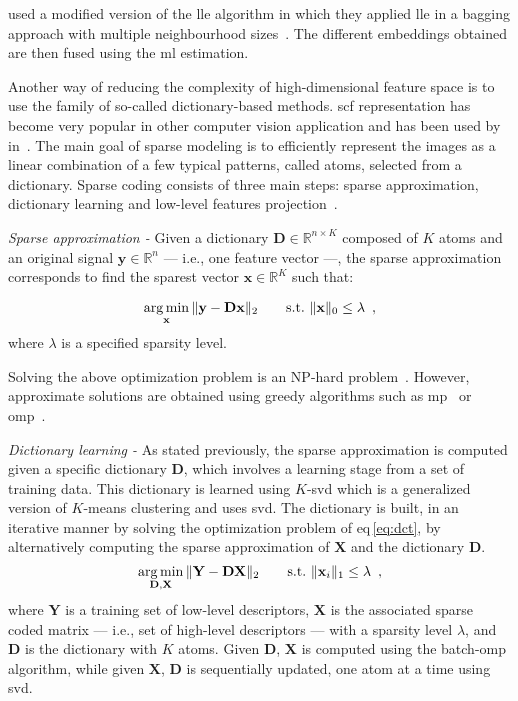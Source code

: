 \citeauthor{Tiwari2008} used a modified version of the \ac{lle} algorithm in which they applied \ac{lle} in a bagging approach with multiple neighbourhood sizes~\cite{Tiwari2008}.
The different embeddings obtained are then fused using the \ac{ml} estimation.

Another way of reducing the complexity of high-dimensional feature space is to use the family of so-called dictionary-based methods.
\Ac{scf} representation has become very popular in other computer vision application and has been used by \citeauthor{lehaire2014computer} in~\cite{lehaire2014computer}.
The main goal of sparse modeling is to efficiently represent the images as a linear combination of a few typical patterns, called atoms, selected from a dictionary.
Sparse coding consists of three main steps: sparse approximation, dictionary learning and low-level features projection~\cite{rubinstein2008efficient}.

\emph{Sparse approximation -} Given a dictionary $\mathbf{D} \in \mathbb{R}^{n \times K}$ composed of $K$ atoms and an original signal $\mathbf{y} \in \mathbb{R}^{n}$ --- i.e., one feature vector ---, the sparse approximation corresponds to find the sparest vector $\mathbf{x} \in \mathbb{R}^{K}$ such that:

\begin{equation}
  \operatorname*{arg\,min}_{\mathbf{x}}\|\mathbf{y - Dx} \|_{2} \qquad  \text{s.t.} \  \|\mathbf{x}\|_{0} \leq \lambda \, \label{eq:sprapp} \ ,
\end{equation}
\noindent where $\lambda$ is a specified sparsity level.

Solving the above optimization problem is an NP-hard problem~\cite{elad2010sparse}.
However, approximate solutions are obtained using greedy algorithms such as \ac{mp}~\cite{mallat1993matching} or \ac{omp}~\cite{pati1993orthogonal,davis1997adaptive}.

\emph{Dictionary learning -} As stated previously, the sparse approximation is computed given a specific dictionary $\mathbf{D}$, which involves a learning stage from a set of training data.
This dictionary is learned using $K$-\acs*{svd} which is a generalized version of $K$-means clustering and uses \ac{svd}. 
The dictionary is built, in an iterative manner by solving the optimization problem of \acs{eq}\,\eqref{eq:dct}, by alternatively computing the sparse approximation of $\mathbf{X}$ and the dictionary $\mathbf{D}$.
\begin{equation}
  \operatorname*{arg\,min}_{\mathbf{D,X}} \|\mathbf{Y} - \mathbf{D}\mathbf{X}\|_{2} \qquad  \text{s.t.} \  \|\mathbf{x}_{i}\|_{1} \leq \lambda \,\label{eq:dct} \ ,
\end{equation}
\noindent where $\mathbf{Y}$ is a training set of low-level descriptors, $\mathbf{X}$ is the associated sparse coded matrix --- i.e., set of high-level descriptors --- with a sparsity level $\lambda$, and $\mathbf{D}$ is the dictionary with $K$ atoms.
Given $\mathbf{D}$, $\mathbf{X}$ is computed using the batch-\ac{omp} algorithm, while given $\mathbf{X}$, $\mathbf{D}$ is sequentially updated, one atom at a time using \ac{svd}. 

